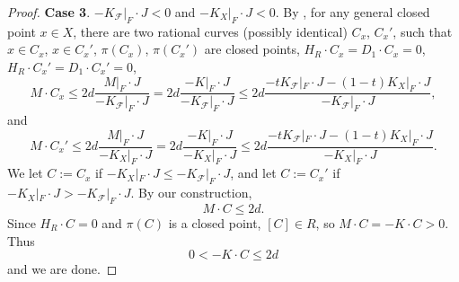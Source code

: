 \documentclass[12pt]{amsart}
\numberwithin{equation}{section}
\newcommand{\Ff}{\mathcal{F}}
\theoremstyle{definition}
\theoremstyle{definition}
\theoremstyle{definition}
\begin{document}
\begin{proof}
\medskip

\noindent\textbf{Case 3}. $-K_{\Ff}|_F\cdot J<0$ and $-K_{X}|_F\cdot J<0$. By \cite[Theorem 8.1.1]{CHLX23}, for any general closed point $x\in X$, there are two rational curves (possibly identical) $C_x$, $C_x'$, such that $x\in C_x$, $x\in C_x'$, $\pi(C_x)$, $\pi(C_x')$ are closed points, $H_R\cdot C_x=D_1\cdot C_x=0$, $H_R\cdot C_x'=D_1\cdot C_x'=0$,
$$M\cdot C_x\leq 2d\frac{M|_F\cdot J}{-K_{\Ff}|_F\cdot J}=2d\frac{-K|_F\cdot J}{-K_{\Ff}|_F\cdot J}\leq 2d\frac{-tK_{\Ff}|_F\cdot J-(1-t)K_X|_F\cdot J}{-K_{\Ff}|_F\cdot J},$$
and
$$M\cdot C_x'\leq 2d\frac{M|_F\cdot J}{-K_{X}|_F\cdot J}=2d\frac{-K|_F\cdot J}{-K_{X}|_F\cdot J}\leq 2d\frac{-tK_{\Ff}|_F\cdot J-(1-t)K_X|_F\cdot J}{-K_{X}|_F\cdot J}.$$
We let $C:=C_x$ if $-K_X|_F\cdot J\leq -K_{\Ff}|_F\cdot J$, and let $C:=C_x'$ if $-K_X|_F\cdot J>-K_{\Ff}|_F\cdot J$. By our construction, 
$$M\cdot C\leq 2d.$$
Since $H_R\cdot C=0$ and $\pi(C)$ is a closed point, $[C]\in R$, so $M\cdot C=-K\cdot C>0$. Thus
$$0<-K\cdot C\leq 2d$$
and we are done.
\end{proof}
\end{document}
